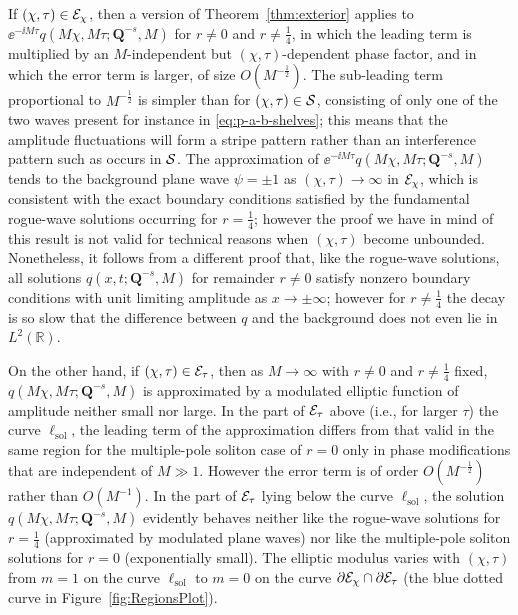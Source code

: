 If $(\chi,\tau)\in\mathcal{E}_\chi$, then a version of Theorem~\ref{thm:exterior} applies to $\ee^{-\ii M\tau}q(M\chi,M\tau;\mathbf{Q}^{-s},M)$ for $r\neq 0$ and $r\neq\tfrac{1}{4}$, in which the leading term is multiplied by an $M$-independent but $(\chi,\tau)$-dependent phase factor, and in which the error term is larger, of size $O(M^{-\frac{1}{2}})$.  The sub-leading term proportional to $M^{-\frac{1}{2}}$ is simpler than for $(\chi,\tau)\in\mathcal{S}$, consisting of only one of the two waves present for instance in \eqref{eq:p-a-b-shelves}; this means that the amplitude fluctuations will form a stripe pattern rather than an interference pattern such as occurs in $\mathcal{S}$.  The approximation of $\ee^{-\ii M\tau}q(M\chi,M\tau;\mathbf{Q}^{-s},M)$ tends to the background plane wave $\psi=\pm 1$ as $(\chi,\tau)\to\infty$ in $\mathcal{E}_\chi$, which is consistent with the exact boundary conditions satisfied by the fundamental rogue-wave solutions occurring for $r=\tfrac{1}{4}$; however the proof we have in mind of this result is not valid for technical reasons when $(\chi,\tau)$ become unbounded.  Nonetheless, it follows from a different proof that, like the rogue-wave solutions, all solutions $q(x,t;\mathbf{Q}^{-s},M)$ for remainder $r\neq 0$ satisfy nonzero boundary conditions with unit limiting amplitude as $x\to\pm\infty$; however for $r\neq\tfrac{1}{4}$ the decay is so slow that the difference between $q$ and the background does not even lie in $L^2(\mathbb{R})$.

On the other hand, if $(\chi,\tau)\in\mathcal{E}_\tau$, then as $M\to\infty$ with $r\neq 0$ and $r\neq\tfrac{1}{4}$ fixed, $q(M\chi,M\tau;\mathbf{Q}^{-s},M)$ is approximated by a modulated elliptic function of amplitude neither small nor large.  In the part of $\mathcal{E}_\tau$ above (i.e., for larger $\tau$) the curve $\ell_\mathrm{sol}$, the leading term of the approximation differs from that valid in the same region for the multiple-pole soliton case of $r=0$ only in phase modifications that are independent of $M\gg 1$.  However the error term is of order $O(M^{-\frac{1}{2}})$ rather than $O(M^{-1})$.  In the part of $\mathcal{E}_\tau$ lying below the curve $\ell_\mathrm{sol}$, the solution $q(M\chi,M\tau;\mathbf{Q}^{-s},M)$ evidently behaves neither like the rogue-wave solutions for $r=\tfrac{1}{4}$ (approximated by modulated plane waves) nor like the multiple-pole soliton solutions for $r=0$ (exponentially small).  The elliptic modulus varies with $(\chi,\tau)$ from $m=1$ on the curve $\ell_\mathrm{sol}$ to $m=0$ on the curve $\partial\mathcal{E}_\chi\cap\partial\mathcal{E}_\tau$ (the blue dotted curve in Figure~\ref{fig:RegionsPlot}).  

